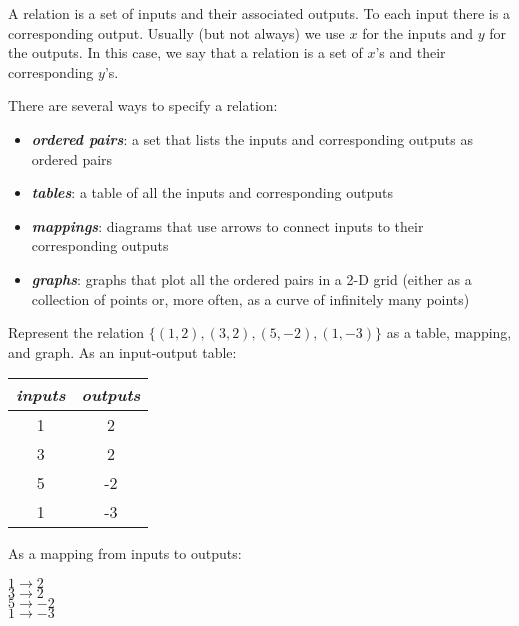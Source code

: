 \documentclass[fleqn,letterpaper,12pt,printwatermark=false]{memoir}
\begin{document}
\begin{myLesson}[][1]
    A relation is a set of inputs and their associated outputs.
    To each input there is a corresponding output.
    Usually (but not always) we use $x$ for the inputs
    and $y$ for the outputs.
    In this case, we say that a relation is 
    a set of $x$'s and their corresponding $y$'s.

    There are several ways to specify a relation:
    \begin{itemize}
        \item {\bfseries\itshape ordered pairs}: 
        a set that lists the inputs and corresponding outputs as ordered pairs
        \item {\bfseries\itshape tables}: 
        a table of all the inputs and corresponding outputs
        \item {\bfseries\itshape mappings}: 
        diagrams that use arrows to connect inputs to their corresponding outputs
        \item {\bfseries\itshape graphs}: 
        graphs that plot all the ordered pairs in a 2-D grid 
        (either as a collection of points or, more often, as a curve of infinitely many points)
    \end{itemize}

    \begin{myWorkedExample}{
            Represent the relation
            \(
                \{ (1,2), (3,2), (5,-2), (1,-3) \}
            \)
            as a table, mapping, and graph.
        }
        As an input-output table:

        \begin{center}
        \begin{tabular}{cc}
            \toprule
            \emph{inputs} & \emph{outputs} \\
            \midrule
            1 & 2\\
            3 & 2\\
            5 & -2\\
            1 & -3\\
            \bottomrule
        \end{tabular}
        \end{center}

        As a mapping from inputs to outputs:

        \begin{center}
            \(
                1 \longrightarrow 2
            \)\\
            \(
                3 \longrightarrow 2
            \)\\
            \(
                5 \longrightarrow -2
            \)\\
            \(
                1 \longrightarrow -3
            \)
        \end{center}
    

\end{myWorkedExample}
\end{myLesson}
\end{document}
